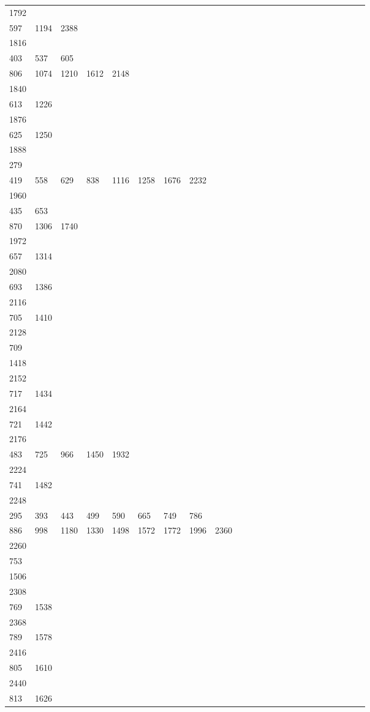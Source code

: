 \begin{longtable}{*{24}{l}}
1792&&&&&&&&&\\
597& 1194& 2388& \\
1816&&&&&&&&&\\
403& 537& 605\\
806& 1074& 1210& 1612& 2148& \\
1840&&&&&&&&&\\
613& 1226& \\
1876&&&&&&&&&\\
625& 1250& \\
1888&&&&&&&&&\\
279\\
419& 558& 629& 838& 1116& 1258& 1676& 2232& \\
1960&&&&&&&&&\\
435& 653\\
870& 1306& 1740& \\
1972&&&&&&&&&\\
657& 1314& \\
2080&&&&&&&&&\\
693& 1386& \\
2116&&&&&&&&&\\
705& 1410& \\
2128&&&&&&&&&\\
709\\
1418& \\
2152&&&&&&&&&\\
717& 1434& \\
2164&&&&&&&&&\\
721& 1442& \\
2176&&&&&&&&&\\
483& 725& 966& 1450& 1932\\
2224&&&&&&&&&\\
741& 1482& \\
2248&&&&&&&&&\\
295& 393& 443& 499& 590& 665& 749& 786\\
886& 998& 1180& 1330& 1498& 1572& 1772& 1996& 2360& \\
2260&&&&&&&&&\\
753\\
1506& \\
2308&&&&&&&&&\\
769& 1538& \\
2368&&&&&&&&&\\
789& 1578& \\
2416&&&&&&&&&\\
805& 1610& \\
2440&&&&&&&&&\\
813& 1626& \\

\end{longtable}
